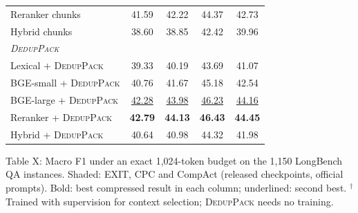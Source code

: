 \documentclass[11pt]{article}
\newcommand{\spk}{\textsc{DedupPack}}
\begin{document}
\begin{table}[h]
{\begin{tabular}{lcccc}
Reranker chunks & 41.59 & 42.22 & 44.37 & 42.73 \\
Hybrid chunks & 38.60 & 38.85 & 42.42 & 39.96 \\
\midrule
\multicolumn{5}{l}{\textit{\spk{}}} \\
Lexical + \spk{} & 39.33 & 40.19 & 43.69 & 41.07 \\
BGE-small + \spk{} & 40.76 & 41.67 & 45.18 & 42.54 \\
BGE-large + \spk{} & \underline{42.28} & \underline{43.98} & \underline{46.23} & \underline{44.16} \\
Reranker + \spk{} & \textbf{42.79} & \textbf{44.13} & \textbf{46.43} & \textbf{44.45} \\
Hybrid + \spk{} & 40.64 & 40.98 & 44.32 & 41.98 \\
\bottomrule
\end{tabular}}
\begin{minipage}{7.7cm}
\vspace{4pt}
\small Table X: Macro F1 under an exact 1,024-token budget on the 1,150 LongBench QA instances. Shaded: EXIT, CPC and CompAct (released checkpoints, official prompts). Bold: best compressed result in each column; underlined: second best. $^\dagger$Trained with supervision for context selection; \spk{} needs no training.
\end{minipage}
\end{table}
\end{document}
